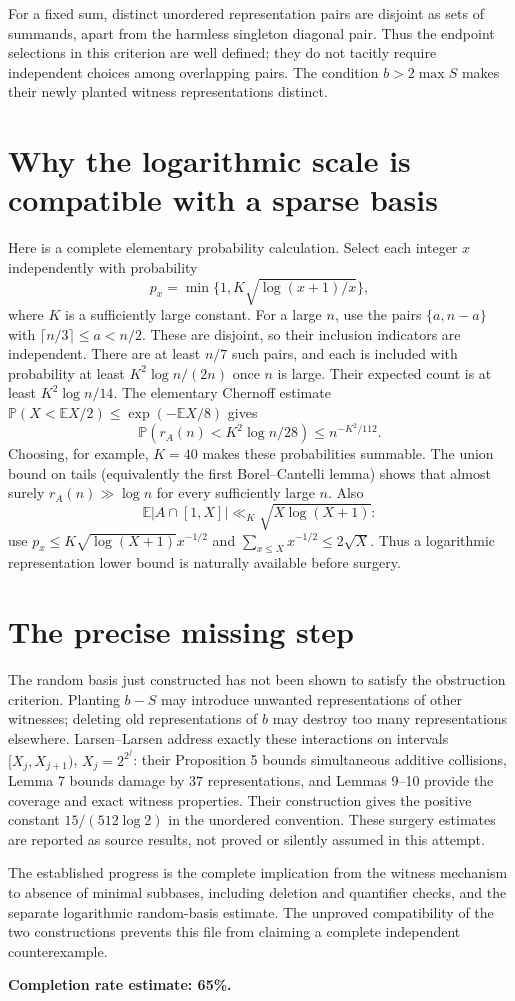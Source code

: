 \documentclass[11pt]{article}
\begin{document}
For a fixed sum, distinct unordered representation pairs are disjoint as sets of summands, apart from the harmless singleton diagonal pair. Thus the endpoint selections in this criterion are well defined; they do not tacitly require independent choices among overlapping pairs. The condition $b>2\max S$ makes their newly planted witness representations distinct.

\section*{Why the logarithmic scale is compatible with a sparse basis}
Here is a complete elementary probability calculation. Select each integer $x$ independently with probability
\[
 p_x=\min\{1,K\sqrt{\log(x+1)/x}\},
\]
where $K$ is a sufficiently large constant. For a large $n$, use the pairs $\{a,n-a\}$ with $\lceil n/3\rceil\le a< n/2$. These are disjoint, so their inclusion indicators are independent. There are at least $n/7$ such pairs, and each is included with probability at least $K^2\log n/(2n)$ once $n$ is large. Their expected count is at least $K^2\log n/14$. The elementary Chernoff estimate $\mathbb P(X<\mathbb EX/2)\le\exp(-\mathbb EX/8)$ gives
\[
 \mathbb P\left(r_A(n)<K^2\log n/28\right)\le n^{-K^2/112}.
\]
Choosing, for example, $K=40$ makes these probabilities summable. The union bound on tails (equivalently the first Borel--Cantelli lemma) shows that almost surely $r_A(n)\gg\log n$ for every sufficiently large $n$. Also
\[
 \mathbb E|A\cap[1,X]|\ll_K\sqrt{X\log(X+1)}:
\]
use $p_x\le K\sqrt{\log(X+1)}x^{-1/2}$ and $\sum_{x\le X}x^{-1/2}\le2\sqrt X$. Thus a logarithmic representation lower bound is naturally available before surgery.

\section*{The precise missing step}
The random basis just constructed has not been shown to satisfy the obstruction criterion. Planting $b-S$ may introduce unwanted representations of other witnesses; deleting old representations of $b$ may destroy too many representations elsewhere. Larsen--Larsen address exactly these interactions on intervals $[X_j,X_{j+1})$, $X_j=2^{2^j}$: their Proposition 5 bounds simultaneous additive collisions, Lemma 7 bounds damage by $37$ representations, and Lemmas 9--10 provide the coverage and exact witness properties. Their construction gives the positive constant $15/(512\log2)$ in the unordered convention. These surgery estimates are reported as source results, not proved or silently assumed in this attempt.

The established progress is the complete implication from the witness mechanism to absence of minimal subbases, including deletion and quantifier checks, and the separate logarithmic random-basis estimate. The unproved compatibility of the two constructions prevents this file from claiming a complete independent counterexample.

\textbf{Completion rate estimate: 65\%.}
\end{document}
